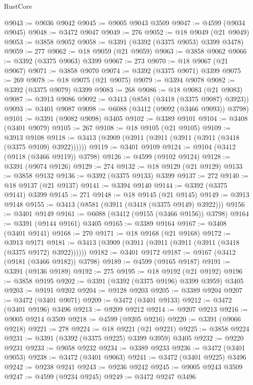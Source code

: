 \begin{lexlean}{RustCore}
\begin{coremodule}
@9043 := @9036 @9042
@9045 := @9005 @9043 @3509
@9047 := @4599 (@9034 @9045)
@9048 := @3472 @9047
@9049 := 276
@9052 := @18 @9049 (@21 @9049)
@9053 := @3858 @9052
@9058 := @3391 (@3392 (@3375 @9053) @3399 @3478)
@9059 := 277
@9062 := @18 @9059 (@21 @9059)
@9063 := @3858 @9062
@9066 := @3392 (@3375 @9063) @3399
@9067 := 273
@9070 := @18 @9067 (@21 @9067)
@9071 := @3858 @9070
@9074 := @3392 (@3375 @9071) @3399
@9075 := 269
@9078 := @18 @9075 (@21 @9075)
@9079 := @3394 @9078
@9082 := @3392 (@3375 @9079) @3399
@9083 := 268
@9086 := @18 @9083 (@21 @9083)
@9087 := @3913 @9086
@9092 := @3413 (@8581 (@3418 (@3375 @9087) @3923))
@9093 := @3401 @9087
@9098 := @6088 (@3412 (@9092 (@3466 @9093)) @3798)
@9101 := @3391 (@9082 @9098) @3405
@9102 := @3389 @9101
@9104 := @3408 (@3401 @9079)
@9105 := 267
@9108 := @18 @9105 (@21 @9105)
@9109 := @3913 @9108
@9118 := @3413 (@3909 (@3911 (@3911 (@3911 (@3911 (@3418 (@3375 @9109) @3922))))))
@9119 := @3401 @9109
@9124 := @9104 (@3412 (@9118 (@3466 @9119)) @3798)
@9126 := @4599 (@9102 @9124)
@9128 := @3391 (@9074 @9126)
@9129 := 274
@9132 := @18 @9129 (@21 @9129)
@9133 := @3858 @9132
@9136 := @3392 (@3375 @9133) @3399
@9137 := 272
@9140 := @18 @9137 (@21 @9137)
@9141 := @3394 @9140
@9144 := @3392 (@3375 @9141) @3399
@9145 := 271
@9148 := @18 @9145 (@21 @9145)
@9149 := @3913 @9148
@9155 := @3413 (@8581 (@3911 (@3418 (@3375 @9149) @3922)))
@9156 := @3401 @9149
@9161 := @6088 (@3412 (@9155 (@3466 @9156)) @3798)
@9164 := @3391 (@9144 @9161) @3405
@9165 := @3389 @9164
@9167 := @3408 (@3401 @9141)
@9168 := 270
@9171 := @18 @9168 (@21 @9168)
@9172 := @3913 @9171
@9181 := @3413 (@3909 (@3911 (@3911 (@3911 (@3911 (@3418 (@3375 @9172) @3922))))))
@9182 := @3401 @9172
@9187 := @9167 (@3412 (@9181 (@3466 @9182)) @3798)
@9189 := @4599 (@9165 @9187)
@9191 := @3391 (@9136 @9189)
@9192 := 275
@9195 := @18 @9192 (@21 @9192)
@9196 := @3858 @9195
@9202 := @3391 (@3392 (@3375 @9196) @3399 @3959) @3405
@9203 := @9191 @9202
@9204 := @9128 @9203
@9205 := @3389 @9204
@9207 := @3472 (@3401 @9071)
@9209 := @3472 (@3401 @9133)
@9212 := @3472 (@3401 @9196) @3496
@9213 := @9209 @9212
@9214 := @9207 @9213
@9216 := @9005 @9214 @3509
@9218 := @4599 (@9205 @9216)
@9220 := @3391 (@9066 @9218)
@9221 := 278
@9224 := @18 @9221 (@21 @9221)
@9225 := @3858 @9224
@9231 := @3391 (@3392 (@3375 @9225) @3399 @3959) @3405
@9232 := @9220 @9231
@9233 := @9058 @9232
@9234 := @3389 @9233
@9236 := @3472 (@3401 @9053)
@9238 := @3472 (@3401 @9063)
@9241 := @3472 (@3401 @9225) @3496
@9242 := @9238 @9241
@9243 := @9236 @9242
@9245 := @9005 @9243 @3509
@9247 := @4599 (@9234 @9245)
@9249 := @3472 @9247 @3496

\end{coremodule}
\end{lexlean}
